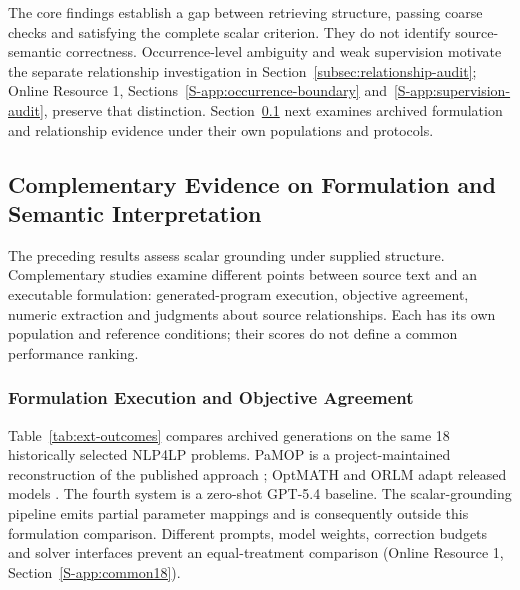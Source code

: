 \documentclass[pdflatex,iicol,sn-basic,Numbered]{sn-jnl}
\begin{document}
\label{subsec:numerical-grounding-challenges}
The core findings establish a gap between retrieving structure, passing coarse checks and satisfying the complete scalar criterion. They do not identify source-semantic correctness. Occurrence-level ambiguity and weak supervision motivate the separate relationship investigation in Section~\ref{subsec:relationship-audit}; Online Resource 1, Sections~\ref{S-app:occurrence-boundary} and~\ref{S-app:supervision-audit}, preserve that distinction. Section~\ref{sec:llm} next examines archived formulation and relationship evidence under their own populations and protocols.

\subsection{Complementary Evidence on Formulation and Semantic Interpretation}
\label{sec:llm}
The preceding results assess scalar grounding under supplied structure. Complementary studies examine different points between source text and an executable formulation: generated-program execution, objective agreement, numeric extraction and judgments about source relationships. Each has its own population and reference conditions; their scores do not define a common performance ranking.

\subsubsection{Formulation Execution and Objective Agreement}
\label{subsec:exp_external}
Table~\ref{tab:ext-outcomes} compares archived generations on the same 18 historically selected NLP4LP problems. PaMOP is a project-maintained reconstruction of the published approach \cite{pan2025pamop}; OptMATH and ORLM adapt released models \cite{lu2025optmath,huang2025orlm}. The fourth system is a zero-shot GPT-5.4 baseline. The scalar-grounding pipeline emits partial parameter mappings and is consequently outside this formulation comparison. Different prompts, model weights, correction budgets and solver interfaces prevent an equal-treatment comparison (Online Resource 1, Section~\ref{S-app:common18}).
\end{document}
